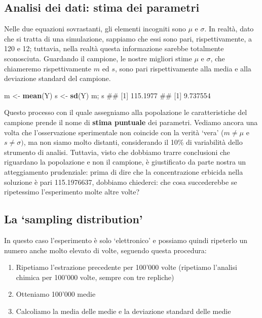 \documentclass[a4paper,12pt,oneside]{book}
\providecommand{\tightlist}{%
  \setlength{\itemsep}{0pt}\setlength{\parskip}{0pt}}
\newenvironment{Shaded}{\begin{snugshade}}{\end{snugshade}}
\newcommand{\KeywordTok}[1]{\textcolor[rgb]{0.13,0.29,0.53}{\textbf{#1}}}
\newcommand{\StringTok}[1]{\textcolor[rgb]{0.31,0.60,0.02}{#1}}
\newcommand{\NormalTok}[1]{#1}
\theoremstyle{definition}
\theoremstyle{definition}
\theoremstyle{definition}
\theoremstyle{remark}
\begin{document}
\subsection{Analisi dei dati: stima dei
parametri}\label{analisi-dei-dati-stima-dei-parametri}

Nelle due equazioni sovrastanti, gli elementi incogniti sono \(\mu\) e
\(\sigma\). In realtà, dato che si tratta di una simulazione, sappiamo
che essi sono pari, rispettivamente, a 120 e 12; tuttavia, nella realtà
questa informazione sarebbe totalmente sconosciuta. Guardando il
campione, le nostre migliori stime \(\mu\) e \(\sigma\), che chiameremo
rispettivamente \(m\) ed \(s\), sono pari rispettivamente alla media e
alla deviazione standard del campione.

\begin{Shaded}
\begin{Highlighting}[]
\NormalTok{m <-}\StringTok{ }\KeywordTok{mean}\NormalTok{(Y)}
\NormalTok{s <-}\StringTok{ }\KeywordTok{sd}\NormalTok{(Y)}
\NormalTok{m; s}
\NormalTok{## [1] 115.1977}
\NormalTok{## [1] 9.737554}
\end{Highlighting}
\end{Shaded}

Questo processo con il quale assegniamo alla popolazione le
caratteristiche del campione prende il nome di \textbf{stima puntuale}
dei parametri. Vediamo ancora una volta che l'osservazione sperimentale
non coincide con la verità `vera' (\(m \ne \mu\) e \(s \ne \sigma)\), ma
non siamo molto distanti, considerando il 10\% di variabilità dello
strumento di analisi. Tuttavia, visto che dobbiamo trarre conclusioni
che riguardano la popolazione e non il campione, è giustificato da parte
nostra un atteggiamento prudenziale: prima di dire che la concentrazione
erbicida nella soluzione è pari 115.1976637, dobbiamo chiederci: che
cosa succederebbe se ripetessimo l'esperimento molte altre volte?

\subsection{\texorpdfstring{La `sampling
distribution'}{La sampling distribution}}\label{la-sampling-distribution}

In questo caso l'esperimento è solo `elettronico' e possiamo quindi
ripeterlo un numero anche molto elevato di volte, seguendo questa
procedura:

\begin{enumerate}
\def\labelenumi{\arabic{enumi}.}
\tightlist
\item
  Ripetiamo l'estrazione precedente per 100'000 volte (ripetiamo
  l'analisi chimica per 100'000 volte, sempre con tre repliche)
\item
  Otteniamo 100'000 medie
\item
  Calcoliamo la media delle medie e la deviazione standard delle medie
\end{enumerate}
\end{document}
